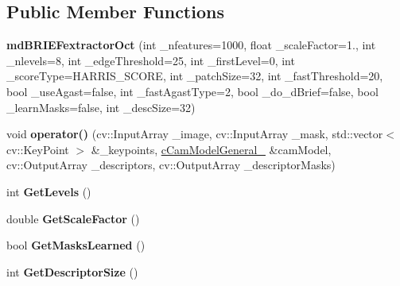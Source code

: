 \subsection*{Public Member Functions}
\begin{DoxyCompactItemize}
\item 
{\bfseries md\+B\+R\+I\+E\+Fextractor\+Oct} (int \+\_\+nfeatures=1000, float \+\_\+scale\+Factor=1., int \+\_\+nlevels=8, int \+\_\+edge\+Threshold=25, int \+\_\+first\+Level=0, int \+\_\+score\+Type=H\+A\+R\+R\+I\+S\+\_\+\+S\+C\+O\+RE, int \+\_\+patch\+Size=32, int \+\_\+fast\+Threshold=20, bool \+\_\+use\+Agast=false, int \+\_\+fast\+Agast\+Type=2, bool \+\_\+do\+\_\+d\+Brief=false, bool \+\_\+learn\+Masks=false, int \+\_\+desc\+Size=32)\hypertarget{classMultiColSLAM_1_1mdBRIEFextractorOct_a97fcc207bd3003b907ab1215afa5456d}{}\label{classMultiColSLAM_1_1mdBRIEFextractorOct_a97fcc207bd3003b907ab1215afa5456d}

\item 
void {\bfseries operator()} (cv\+::\+Input\+Array \+\_\+image, cv\+::\+Input\+Array \+\_\+mask, std\+::vector$<$ cv\+::\+Key\+Point $>$ \&\+\_\+keypoints, \hyperlink{classMultiColSLAM_1_1cCamModelGeneral__}{c\+Cam\+Model\+General\+\_\+} \&cam\+Model, cv\+::\+Output\+Array \+\_\+descriptors, cv\+::\+Output\+Array \+\_\+descriptor\+Masks)\hypertarget{classMultiColSLAM_1_1mdBRIEFextractorOct_a58b277ef92295a6093b770fe60fb2d9c}{}\label{classMultiColSLAM_1_1mdBRIEFextractorOct_a58b277ef92295a6093b770fe60fb2d9c}

\item 
int {\bfseries Get\+Levels} ()\hypertarget{classMultiColSLAM_1_1mdBRIEFextractorOct_a93c891bb1a8ae2f9575b13514fafa4c8}{}\label{classMultiColSLAM_1_1mdBRIEFextractorOct_a93c891bb1a8ae2f9575b13514fafa4c8}

\item 
double {\bfseries Get\+Scale\+Factor} ()\hypertarget{classMultiColSLAM_1_1mdBRIEFextractorOct_a657048e5277d37abd4a28b2ed13935bb}{}\label{classMultiColSLAM_1_1mdBRIEFextractorOct_a657048e5277d37abd4a28b2ed13935bb}

\item 
bool {\bfseries Get\+Masks\+Learned} ()\hypertarget{classMultiColSLAM_1_1mdBRIEFextractorOct_aec28f8f96ec4cef48e398fa9c79e26a8}{}\label{classMultiColSLAM_1_1mdBRIEFextractorOct_aec28f8f96ec4cef48e398fa9c79e26a8}

\item 
int {\bfseries Get\+Descriptor\+Size} ()\hypertarget{classMultiColSLAM_1_1mdBRIEFextractorOct_ac6604059484ce79a9e46d9f6219db9bc}{}\label{classMultiColSLAM_1_1mdBRIEFextractorOct_ac6604059484ce79a9e46d9f6219db9bc}

\end{DoxyCompactItemize}
